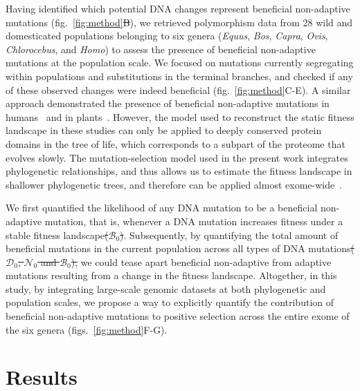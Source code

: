 \documentclass{article}
\newcommand{\SphyDel}{\mathcal{D}_0}
\newcommand{\SphyNeu}{\mathcal{N}_0}
\newcommand{\SphyBen}{\mathcal{B}_0}
\providecommand{\DIFaddtex}[1]{{\protect\color{blue}\uwave{#1}}} %
\providecommand{\DIFdeltex}[1]{{\protect\color{red}\sout{#1}}}                      %
\providecommand{\DIFaddbegin}{} %
\providecommand{\DIFaddend}{} %
\providecommand{\DIFdelbegin}{} %
\providecommand{\DIFdelend}{} %
\providecommand{\DIFadd}[1]{\texorpdfstring{\DIFaddtex{#1}}{#1}} %
\providecommand{\DIFdel}[1]{\texorpdfstring{\DIFdeltex{#1}}{}} %
\newcommand{\DIFscaledelfig}{0.5}
\newlength{\DIFdelgraphicswidth} %
\newlength{\DIFdelgraphicsheight} %
\newcommand{\DIFaddincludegraphics}[2][]{{\color{blue}\fbox{\DIFOincludegraphics[#1]{#2}}}} %
\newcommand{\DIFdelincludegraphics}[2][]{%
\sbox{\DIFdelgraphicsbox}{\DIFOincludegraphics[#1]{#2}}%
\settoboxwidth{\DIFdelgraphicswidth}{\DIFdelgraphicsbox} %
\settoboxtotalheight{\DIFdelgraphicsheight}{\DIFdelgraphicsbox} %
\scalebox{\DIFscaledelfig}{%
\parbox[b]{\DIFdelgraphicswidth}{\usebox{\DIFdelgraphicsbox}\\[-\baselineskip] \rule{\DIFdelgraphicswidth}{0em}}\llap{\resizebox{\DIFdelgraphicswidth}{\DIFdelgraphicsheight}{%
\setlength{\unitlength}{\DIFdelgraphicswidth}%
\begin{picture}(1,1)%
\thicklines\linethickness{2pt} %
{\color[rgb]{1,0,0}\put(0,0){\framebox(1,1){}}}%
{\color[rgb]{1,0,0}\put(0,0){\line( 1,1){1}}}%
{\color[rgb]{1,0,0}\put(0,1){\line(1,-1){1}}}%
\end{picture}%
}\hspace*{3pt}}} %
} %
\DeclareRobustCommand{\DIFaddbegin}{\DIFOaddbegin \let\includegraphics\DIFaddincludegraphics} %
\DeclareRobustCommand{\DIFaddend}{\DIFOaddend \let\includegraphics\DIFOincludegraphics} %
\DeclareRobustCommand{\DIFdelbegin}{\DIFOdelbegin \let\includegraphics\DIFdelincludegraphics} %
\DeclareRobustCommand{\DIFdelend}{\DIFOaddend \let\includegraphics\DIFOincludegraphics} %
\begin{document}
\DIFdelend Having identified which potential DNA changes represent beneficial non-adaptive mutations (fig.~\ref{fig:method}\DIFdelbegin \DIFdel{B}\DIFdelend \DIFaddbegin \DIFadd{A-B}\DIFaddend ), we retrieved polymorphism data from 28 wild and domesticated populations belonging to six genera (\textit{Equus}, \textit{Bos}, \textit{Capra}, \textit{Ovis}, \textit{Chlorocebus}, and \textit{Homo}) to assess the presence of beneficial non-adaptive mutations at the population scale.
    We focused on \DIFaddbegin \DIFadd{both }\DIFaddend mutations currently segregating within populations and \DIFaddbegin \DIFadd{on }\DIFaddend substitutions in the terminal branches, and checked if any of these observed changes were indeed beneficial (fig.~\ref{fig:method}C-E).
    A similar approach demonstrated the presence of beneficial non-adaptive mutations in humans~\cite{moses_inferring_2009, fischer_germline_2011} and in plants~\cite{chen_hunting_2021}.
    However, the model used to reconstruct the static fitness landscape in these studies can only be applied to deeply conserved protein domains in the tree of life, which corresponds to a subpart of the proteome that evolves slowly.
    The mutation-selection model used in the present work integrates phylogenetic relationships, and thus allows us to estimate the fitness landscape in shallower phylogenetic trees, and therefore can be applied almost exome-wide~\cite{rodrigue_mutationselection_2010}.

    We first quantified the likelihood of any DNA mutation to be a beneficial non-adaptive mutation, that is, whenever a DNA mutation increases fitness under a stable fitness landscape\DIFdelbegin \DIFdel{($\SphyBen$)}\DIFdelend .
    Subsequently, by quantifying the total amount of beneficial mutations in the current population across all types of DNA mutations\DIFdelbegin \DIFdel{($\SphyDel$, $\SphyNeu$ and $\SphyBen$), }\DIFdelend \DIFaddbegin \DIFadd{, }\DIFaddend we could tease apart beneficial non-adaptive from adaptive mutations resulting from a change in the fitness landscape.
    Altogether, in this study, by integrating large-scale genomic datasets at both phylogenetic and population scales, we propose a way to explicitly quantify the contribution of beneficial non-adaptive mutations to positive selection across the entire exome of the six genera (figs.~\ref{fig:method}F-G).

    \section*{Results}
\end{document}
